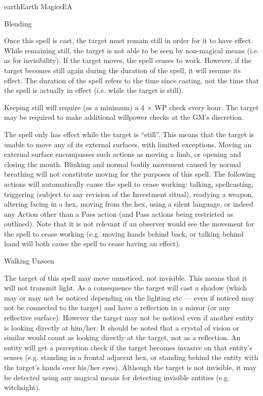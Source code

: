 \begin{College}[1.2]{earth}{Earth Magics}{EA}
\begin{spell}[G-4]{Blending}
\begin{effects}
Once this spell is cast, the target must remain still in order for it
to have effect.  While remaining still, the target is not able to be
seen by non-magical means (i.e.  as for invisibility).  If the target
moves, the spell ceases to work. However, if the target becomes still
again during the duration of the spell, it will resume its effect.
The duration of the spell refers to the time since casting, not the
time that the spell is actually in effect (i.e.  while the target is
still).

Keeping still will require (as a minimum) a 4 × WP check every hour.
The target may be required to make additional willpower checks at the
GM’s discretion.

The spell only has effect while the target is “still”.  This means
that the target is unable to move any of its external surfaces, with
limited exceptions. Moving an external surface encompasses such
actions as moving a limb, or opening and closing the mouth.  Blinking
and normal bodily movement caused by normal breathing will not
constitute moving for the purposes of this spell.  The following
actions will automatically cause the spell to cease working: talking,
spellcasting, triggering (subject to any revision of the Investment
ritual), readying a weapon, altering facing in a hex, moving from the
hex, using a silent language, or indeed any Action other than a Pass
action (and Pass actions being restricted as outlined).  Note that it
is not relevant if an observer would see the movement for the spell
to cease working (e.g.  moving hands behind back, or talking behind
hand will both cause the spell to cease having an effect).
\end{effects}
\end{spell}

\begin{spell}[G-5]{Walking Unseen}

\begin{effects}
The target of this spell may move unnoticed, not invisible.  This
means that it will not transmit light. As a consequence the target
will cast a shadow (which may or may not be noticed depending on the
lighting etc — even if noticed may not be connected to the target) and
have a reflection in a mirror (or any reflective surface).  However
the target may not be noticed even if another entity is looking
directly at him/her.  It should be noted that a crystal of vision or
similar would count as looking directly at the target, not as a
reflection.  An entity will get a perception check if the target
becomes invasive on that entity’s senses (e.g. standing in a frontal
adjacent hex, or standing behind the entity with the target’s hands
over his/her eyes). Although the target is not invisible, it may be
detected using any magical means for detecting invisible entities
(e.g. witchsight).


\end{effects}
\end{spell}
\end{College}
